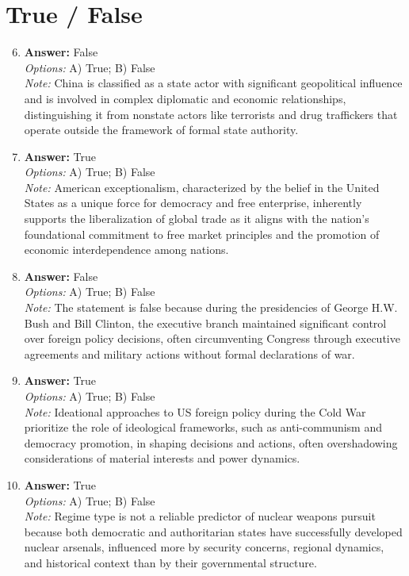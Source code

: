 \documentclass[12pt]{article}
\begin{document}
\section*{True / False}
\begin{enumerate}[label=\arabic*.]
\setcounter{enumi}{5}
\item \textbf{Answer:} False
\\ \textit{Options:} A) True; B) False
\\ \textit{Note:} China is classified as a state actor with significant geopolitical influence and is involved in complex diplomatic and economic relationships, distinguishing it from nonstate actors like terrorists and drug traffickers that operate outside the framework of formal state authority.
\item \textbf{Answer:} True
\\ \textit{Options:} A) True; B) False
\\ \textit{Note:} American exceptionalism, characterized by the belief in the United States as a unique force for democracy and free enterprise, inherently supports the liberalization of global trade as it aligns with the nation's foundational commitment to free market principles and the promotion of economic interdependence among nations.
\item \textbf{Answer:} False
\\ \textit{Options:} A) True; B) False
\\ \textit{Note:} The statement is false because during the presidencies of George H.W. Bush and Bill Clinton, the executive branch maintained significant control over foreign policy decisions, often circumventing Congress through executive agreements and military actions without formal declarations of war.
\item \textbf{Answer:} True
\\ \textit{Options:} A) True; B) False
\\ \textit{Note:} Ideational approaches to US foreign policy during the Cold War prioritize the role of ideological frameworks, such as anti-communism and democracy promotion, in shaping decisions and actions, often overshadowing considerations of material interests and power dynamics.
\item \textbf{Answer:} True
\\ \textit{Options:} A) True; B) False
\\ \textit{Note:} Regime type is not a reliable predictor of nuclear weapons pursuit because both democratic and authoritarian states have successfully developed nuclear arsenals, influenced more by security concerns, regional dynamics, and historical context than by their governmental structure.
\end{enumerate}
\end{document}
